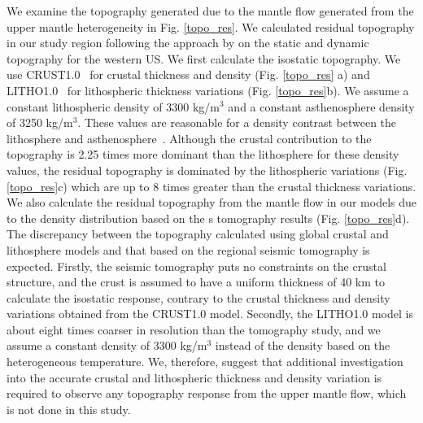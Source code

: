\documentclass[draft,linenumbers]{agujournal2018}
\begin{document}
    We examine the topography generated due to the mantle flow generated from the upper mantle heterogeneity in Fig. \ref{topo_res}. We calculated residual topography in our study region following the approach by \citet{becker2014static} on the static and dynamic topography for the western US. We first calculate the isostatic topography. We use CRUST1.0~\citep{laske2013update} for crustal thickness and density (Fig. \ref{topo_res} a) and LITHO1.0~\citep{pasyanos2014litho1} for lithospheric thickness variations (Fig. \ref{topo_res}b). We assume a constant lithospheric density of 3300 kg/m$^3$ and a constant asthenosphere density of 3250 kg/m$^3$. These values are reasonable for a density contrast between the lithosphere and asthenosphere~\citep[e.g.,][]{bonnardot2008numerical, ito2011probing}. Although the crustal contribution to the topography is 2.25 times more dominant than the lithosphere for these density values, the residual topography is dominated by the lithospheric variations (Fig. \ref{topo_res}c) which are up to 8 times greater than the crustal thickness variations. We also calculate the residual topography from the mantle flow in our models due to the density distribution based on the \citet{Biryol_2016}s tomography results (Fig. \ref{topo_res}d). The discrepancy between the topography calculated using global crustal and lithosphere models and that based on the regional seismic tomography is expected. Firstly, the seismic tomography puts no constraints on the crustal structure, and the crust is assumed to have a uniform thickness of 40 km to calculate the isostatic response, contrary to the crustal thickness and density variations obtained from the CRUST1.0 model. Secondly, the LITHO1.0 model is about eight times coarser in resolution than the tomography study, and we assume a constant density of 3300 kg/m$^3$ instead of the density based on the heterogeneous temperature. We, therefore, suggest that additional investigation into the accurate crustal and lithospheric thickness and density variation is required to observe any topography response from the upper mantle flow, which is not done in this study.
%
\end{document}
